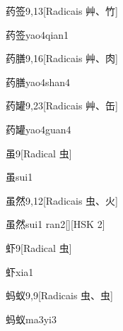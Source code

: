\begin{entry}{药签}{9,13}[Radicais ⾋、⽵]
  \begin{phonetics}{药签}{yao4qian1}
  \end{phonetics}
\end{entry}

\begin{entry}{药膳}{9,16}[Radicais ⾋、⾁]
  \begin{phonetics}{药膳}{yao4shan4}
  \end{phonetics}
\end{entry}

\begin{entry}{药罐}{9,23}[Radicais ⾋、⽸]
  \begin{phonetics}{药罐}{yao4guan4}
  \end{phonetics}
\end{entry}

\begin{entry}{虽}{9}[Radical ⾍]
  \begin{phonetics}{虽}{sui1}
  \end{phonetics}
\end{entry}

\begin{entry}{虽然}{9,12}[Radicais ⾍、⽕]
  \begin{phonetics}{虽然}{sui1 ran2}[][HSK 2]
  \end{phonetics}
\end{entry}

\begin{entry}{虾}{9}[Radical ⾍]
  \begin{phonetics}{虾}{xia1}
  \end{phonetics}
\end{entry}

\begin{entry}{蚂蚁}{9,9}[Radicais ⾍、⾍]
  \begin{phonetics}{蚂蚁}{ma3yi3}
  \end{phonetics}
\end{entry}

